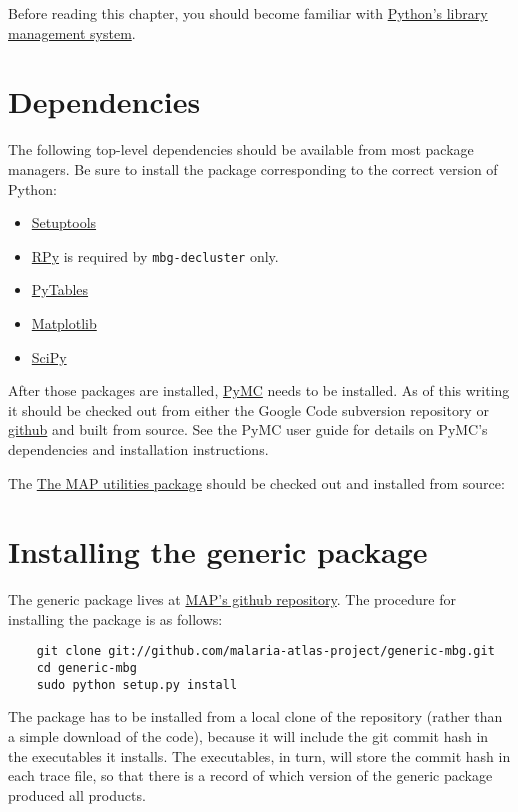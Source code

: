 \bigskip
Before reading this chapter, you should become familiar with \href{http://docs.python.org/install/index.html}{Python's library management system}.

\section{Dependencies}

The following top-level dependencies should be available from most package managers. Be sure to install the package corresponding to the correct version of Python:
\begin{itemize}
    \item \href{http://pypi.python.org/pypi/setuptools}{Setuptools} 
    \item \href{http://rpy.sourceforge.net}{RPy} is required by \texttt{mbg-decluster} only. 
    \item \href{http://www.pytables.org}{PyTables}
    \item \href{http://matplotlib.sourceforge.net}{Matplotlib}  
    \item \href{http://www.scipy.org}{SciPy} 
\end{itemize}

After those packages are installed, \href{http://code.google.com/p/pymc}{PyMC} needs to be installed. As of this writing it should be checked out from either the Google Code subversion repository or \href{http://github.com/pymc-devs/pymc}{github} and built from source. See the PyMC user guide for details on PyMC's dependencies and installation instructions.

The \href{http://github.com/malaria-atlas-project/map_utils}{The MAP utilities package} should be checked out and installed from source:

\section{Installing the generic package}
The generic package lives at \href{http://github.com/malaria-atlas-project/generic-mbg}{MAP's github repository}. The procedure for installing the package is as follows:

\begin{verbatim}
    git clone git://github.com/malaria-atlas-project/generic-mbg.git
    cd generic-mbg
    sudo python setup.py install
\end{verbatim}

The package has to be installed from a local clone of the repository (rather than a simple download of the code), because it will include the git commit hash in the executables it installs. The executables, in turn, will store the commit hash in each trace file, so that there is a record of which version of the generic package produced all products.

